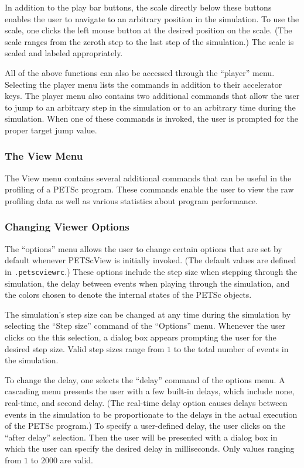 In addition to the play bar buttons, the scale directly below these
buttons enables the user to navigate to an arbitrary position in the
simulation.  To use the scale, one clicks the left mouse button at
the desired position on the scale.  (The scale ranges from the zeroth
step to the last step of the simulation.)  The scale is scaled and
labeled appropriately.

All of the above functions can also be accessed through the ``player''
menu.  Selecting the player menu lists the commands in addition to
their accelerator keys.  The player menu also contains two additional
commands that allow the user to jump to an arbitrary step in the
simulation or to an arbitrary time during the simulation.  When one of
these commands is invoked, the user is prompted for the proper target
jump value.

\subsubsection{The View Menu}

The View menu contains several additional commands that can be useful
in the profiling of a PETSc program.  These commands enable the user
to view the raw profiling data as well as various statistics about
program performance.

\subsubsection{Changing Viewer Options}

The ``options'' menu allows the user to change certain options that
are set by default whenever PETScView is initially invoked.
(The default values are defined in {\tt .petscviewrc}.) These options
include the step size when stepping through the simulation, the delay
between events when playing through the simulation, and the colors
chosen to denote the internal states of the PETSc objects.

The simulation's step size can be changed at any time during the
simulation by selecting the ``Step size'' command of the ``Options''
menu.  Whenever the user clicks on the this selection, a dialog box
appears prompting the user for the desired step size.  Valid step
sizes range from $1$ to the total number of events in the simulation.

To change the delay, one selects the ``delay'' command of the options
menu.  A cascading menu presents the user with a few built-in delays,
which include none, real-time, and second delay.  (The real-time
delay option causes delays between events in the simulation to be
proportionate to the delays in the actual execution of the PETSc
program.)  To specify a user-defined delay, the user clicks on
the ``after delay'' selection.  Then the user will be
presented with a dialog box in which the user can specify the desired
delay in milliseconds.  Only values ranging from $1$ to $2000$ are
valid.

